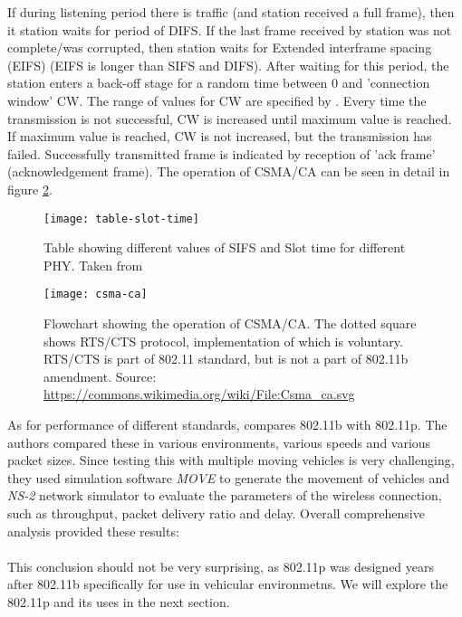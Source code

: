 % 
If during listening period there is traffic (and station received a full frame), then it station waits for period of DIFS. If the last frame received by station was not complete/was corrupted, then station waits for Extended interframe spacing (EIFS) (EIFS is longer than SIFS and DIFS). After waiting for this period, the station enters a back-off stage for a random time between 0 and 'connection window' CW. The range of values for CW are specified by \cite{2016IEEEAccess.}. Every time the transmission is not successful, CW is increased until maximum value is reached. If maximum value is reached, CW is not increased, but the transmission has failed. Successfully transmitted frame is indicated by reception of 'ack frame' (acknowledgement frame). The operation of CSMA/CA can be seen in detail in figure \ref{fig:csma-ca}.\par
% 
\begin{figure}[h]
    \centering
    \texttt{[image: table-slot-time]}
    \caption{Table showing different values of SIFS and Slot time for different PHY. Taken from \cite{Aboul-Magd2008WirelessPerspective}}
    \label{fig:table-st}
\end{figure}
% 
\begin{figure}
    \centering
    \texttt{[image: csma-ca]}
    \caption{Flowchart showing the operation of CSMA/CA. The dotted square shows RTS/CTS protocol, implementation of which is voluntary. RTS/CTS is part of 802.11 standard, but is not a part of 802.11b amendment. Source: \url{https://commons.wikimedia.org/wiki/File:Csma_ca.svg}}
    \label{fig:csma-ca}
\end{figure}
% 
As for performance of different standards, \cite{Bilgin2013PerformanceAreas} compares 802.11b with 802.11p. The authors compared these in various environments, various speeds and various packet sizes. Since testing this with multiple moving vehicles is very challenging, they used simulation software \emph{MOVE} to generate the movement of vehicles and \emph{NS-2} network simulator to evaluate the parameters of the wireless connection, such as throughput, packet delivery ratio and delay. 
Overall comprehensive analysis provided these results:\\ \\
This conclusion should not be very surprising, as 802.11p was designed years after 802.11b specifically for use in vehicular environmetns. We will explore the 802.11p and its uses in the next section.